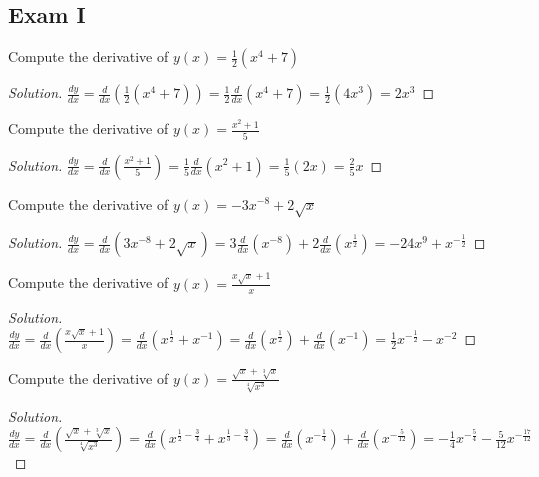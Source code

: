 \documentclass[crop=false,class=book,oneside]{standalone}
\begin{document}
        \subsection{Exam I}
            \begin{problem}
            Compute the derivative of $y(x)=\frac{1}{2}(x^{4}+7)$
            \end{problem}
            \begin{proof}[Solution]
            $\frac{dy}{dx}=\frac{d}{dx}(\frac{1}{2}(x^{4}+7))=\frac{1}{2}\frac{d}{dx}(x^{4}+7)=\frac{1}{2}(4x^{3})=2x^{3}$
            \end{proof}
            \begin{problem}
            Compute the derivative of $y(x)=\frac{x^{2}+1}{5}$
            \end{problem}
            \begin{proof}[Solution]
            $\frac{dy}{dx}=\frac{d}{dx}(\frac{x^{2}+1}{5})=\frac{1}{5}\frac{d}{dx}(x^{2}+1)=\frac{1}{5}(2x)=\frac{2}{5}x$
            \end{proof}
            \begin{problem}
            Compute the derivative of $y(x)=-3x^{-8}+2\sqrt{x}$
            \end{problem}
            \begin{proof}[Solution]
            $\frac{dy}{dx}=\frac{d}{dx}(3x^{-8}+2\sqrt{x})=3\frac{d}{dx}(x^{-8})+2\frac{d}{dx}(x^{\frac{1}{2}})=-24x^{9}+x^{-\frac{1}{2}}$
            \end{proof}
            \begin{problem}
            Compute the derivative of $y(x)=\frac{x\sqrt{x}+1}{x}$
            \end{problem}
            \begin{proof}[Solution]
            $\frac{dy}{dx}=\frac{d}{dx}(\frac{x\sqrt{x}+1}{x})=\frac{d}{dx}(x^{\frac{1}{2}}+x^{-1})=\frac{d}{dx}(x^{\frac{1}{2}})+\frac{d}{dx}(x^{-1})=\frac{1}{2}x^{-\frac{1}{2}}-x^{-2}$
            \end{proof}
            \begin{problem}
            Compute the derivative of $y(x)=\frac{\sqrt{x}+\sqrt[3]{x}}{\sqrt[4]{x^{3}}}$
            \end{problem}
            \begin{proof}[Solution]
            $\frac{dy}{dx}=\frac{d}{dx}(\frac{\sqrt{x}+\sqrt[3]{x}}{\sqrt[4]{x^{3}}})=\frac{d}{dx}(x^{\frac{1}{2}-\frac{3}{4}}+x^{\frac{1}{3}-\frac{3}{4}})=\frac{d}{dx}(x^{-\frac{1}{4}})+\frac{d}{dx}(x^{-\frac{5}{12}})=-\frac{1}{4}x^{-\frac{5}{4}}-\frac{5}{12}x^{-\frac{17}{12}}$
            \end{proof}
\end{document}
